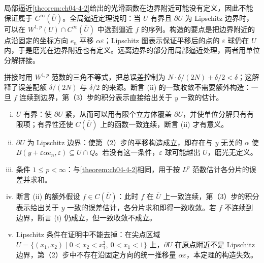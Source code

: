\documentclass[../../main.tex]{subfiles}%
\begin{document}
\begin{remark}\label{remark:ch04-thm-4-3-动机}
局部逼近\cref{theorem:ch04-4-2}给出的光滑函数在边界附近可能没有定义，因此不能保证属于 $C^\infty(\overline{U})$。全局逼近定理说明：当 $U$ 有界且 $\partial U$ 为 Lipschitz 边界时，可以在 $W^{1,p}(U)\cap C^\infty(\overline{U})$ 中选到逼近 $f$ 的序列。构造的要点是把边界附近的点沿固定的坐标方向 $e_n$ 平移 $\alpha\varepsilon$；Lipschitz 图表示保证平移后的点的 $\varepsilon$ 球仍在 $U$ 内，于是磨光在边界附近也有定义。远离边界的部分用局部逼近处理，两者用单位分解拼接。 %

拼接时用 $W^{1,p}$ 范数的三角不等式，把总误差控制为 $N\cdot\delta/(2N)+\delta/2<\delta$；这解释了误差配额 $\delta/(2N)$ 与 $\delta/2$ 的来源。断言 (ii) 的一致收敛不需要额外构造：一旦 $f$ 连续到边界，第（3）步的积分表示直接给出关于 $y$ 一致的估计。
\end{remark}

\begin{remark}\label{remark:ch04-thm-4-3-条件}
\begin{enumerate}[(i)]
\item $U$ 有界：使 $\partial U$ 紧，从而可以用有限个立方体覆盖 $\partial U$，并使单位分解只有有限项；有界性还使 $C(\overline{U})$ 上的函数一致连续，断言 (ii) 才有意义。
\item $\partial U$ 为 Lipschitz 边界：使第（2）步的平移构造成立，即存在与 $y$ 无关的 $\alpha$ 使 $B(y+\varepsilon\alpha e_n,\varepsilon)\subseteq U\cap Q$。若没有这一条件，$\varepsilon$ 球可能越出 $U$，磨光无定义。
\item 条件 $1\leqslant p<\infty$：与\cref{theorem:ch04-4-2}相同，用于按 $L^p$ 范数估计各分片的误差并求和。%
\item 断言 (ii) 的额外假设 $f\in C(\overline{U})$：此时 $f$ 在 $\overline{U}$ 上一致连续，第（3）步的积分表示给出关于 $y$ 一致的误差估计，各分片求和即得一致收敛。若 $f$ 不连续到边界，断言 (i) 仍成立，但一致收敛不成立。
\item Lipschitz 条件在证明中不能去掉：在尖点区域 $U=\{(x_1,x_2)\mid0<x_2<x_1^2,\ 0<x_1<1\}$ 上，$\partial U$ 在原点附近不是 Lipschitz 边界，第（2）步中不存在沿固定方向的统一推移量 $\alpha\varepsilon$，本定理的构造失效。
\end{enumerate}
\end{remark}
\end{document}
